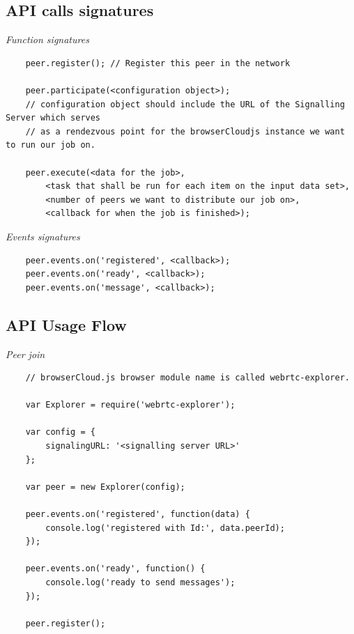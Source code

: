 \subsection{API calls signatures}

\textit{Function signatures}
\begingroup
\scriptsize
\begin{verbatim}
    peer.register(); // Register this peer in the network

    peer.participate(<configuration object>);
    // configuration object should include the URL of the Signalling Server which serves 
    // as a rendezvous point for the browserCloudjs instance we want to run our job on.

    peer.execute(<data for the job>, 
        <task that shall be run for each item on the input data set>,
        <number of peers we want to distribute our job on>,
        <callback for when the job is finished>);

\end{verbatim}
\endgroup

\textit{Events signatures}
\begingroup
\scriptsize
\begin{verbatim}
    peer.events.on('registered', <callback>);
    peer.events.on('ready', <callback>);
    peer.events.on('message', <callback>);

\end{verbatim}
\endgroup

\subsection{API Usage Flow}

\textit{Peer join}
\begingroup
\scriptsize
\begin{verbatim}
    // browserCloud.js browser module name is called webrtc-explorer.

    var Explorer = require('webrtc-explorer');

    var config = {
        signalingURL: '<signalling server URL>'
    };

    var peer = new Explorer(config);

    peer.events.on('registered', function(data) {
        console.log('registered with Id:', data.peerId);
    });

    peer.events.on('ready', function() {
        console.log('ready to send messages');
    });

    peer.register();
\end{verbatim}
\endgroup

